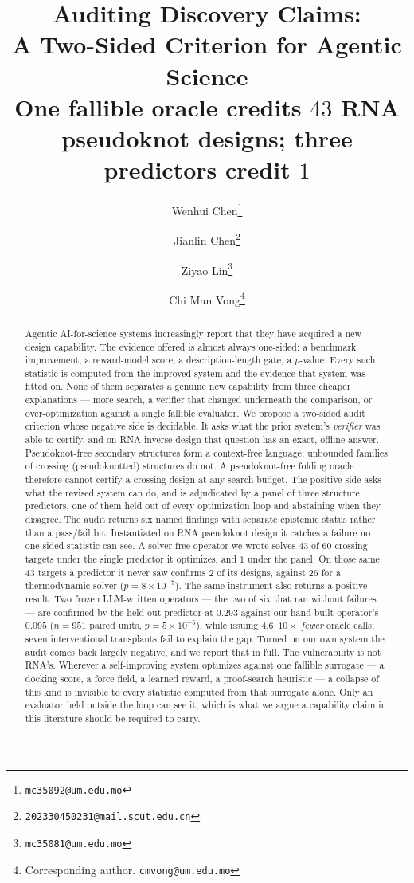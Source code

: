 \documentclass[11pt]{article}
\title{\textbf{Auditing Discovery Claims:\\A Two-Sided Criterion for Agentic Science}\\[5pt]
\large One fallible oracle credits $43$ RNA pseudoknot designs; three predictors credit $1$}
\author[]{}
\affil[]{\vspace{-2.2em}}
\author[1]{Wenhui Chen\thanks{\texttt{mc35092@um.edu.mo}}}
\author[2]{Jianlin Chen\thanks{\texttt{202330450231@mail.scut.edu.cn}}}
\author[1]{Ziyao Lin\thanks{\texttt{mc35081@um.edu.mo}}}
\author[1]{Chi Man Vong\thanks{Corresponding author. \texttt{cmvong@um.edu.mo}}}
\affil[1]{University of Macau}
\affil[2]{South China University of Technology}
\date{}
\begin{document}
\maketitle

\begin{abstract}
\noindent Agentic AI-for-science systems increasingly report that they have acquired a new design capability.
The evidence offered is almost always one-sided: a benchmark improvement, a reward-model score, a
description-length gate, a $p$-value. Every such statistic is computed from the improved system and the
evidence that system was fitted on. None of them separates a genuine new capability from three cheaper
explanations --- more search, a verifier that changed underneath the comparison, or over-optimization against
a single fallible evaluator. We propose a two-sided audit criterion whose negative side is decidable. It asks
what the prior system's \emph{verifier} was able to certify, and on RNA inverse design that question has an
exact, offline answer. Pseudoknot-free secondary structures form a context-free language; unbounded families
of crossing (pseudoknotted) structures do not. A pseudoknot-free folding oracle therefore cannot certify a
crossing design at any search budget. The positive side asks what the revised system can do, and is
adjudicated by a panel of three structure predictors, one of them held out of every optimization loop and
abstaining when they disagree. The audit returns six named findings with separate epistemic status rather
than a pass/fail bit. Instantiated on RNA pseudoknot design it catches a failure no one-sided statistic can
see. A solver-free operator we wrote solves $43$ of $60$ crossing targets under the single predictor it
optimizes, and $1$ under the panel. On those same $43$ targets a predictor it never saw confirms $2$ of its
designs, against $26$ for a thermodynamic solver ($p{=}8\!\times\!10^{-7}$). The same instrument also returns
a positive result. Two frozen LLM-written operators --- the two of six that ran without failures --- are
confirmed by the held-out predictor at $0.293$ against our hand-built operator's $0.095$ ($n{=}951$ paired
units, $p{=}5\!\times\!10^{-5}$), while issuing $4.6$--$10\times$ \emph{fewer} oracle calls; seven
interventional transplants fail to explain the gap. Turned on our own system the audit comes back largely
negative, and we report that in full. The vulnerability is not RNA's. Wherever a self-improving system
optimizes against one fallible surrogate --- a docking score, a force field, a learned reward, a proof-search
heuristic --- a collapse of this kind is invisible to every statistic computed from that surrogate alone. Only
an evaluator held outside the loop can see it, which is what we argue a capability claim in this literature
should be required to carry.
\end{abstract}
\end{document}
